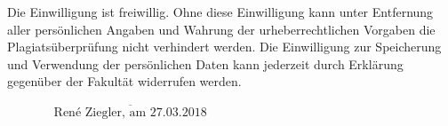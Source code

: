 \documentclass[12pt,oneside,a4paper,parskip]{scrbook}
\def\BaAuthor{René Ziegler}
\def\BaDeadline{27.03.2018}
\begin{document}
\begin{small}
Die Einwilligung ist freiwillig. Ohne diese Einwilligung kann unter Entfernung aller persönlichen Angaben und Wahrung der urheberrechtlichen Vorgaben die Plagiatsüberprüfung nicht verhindert werden. Die Einwilligung zur Speicherung und Verwendung der persönlichen Daten kann jederzeit durch Erklärung gegenüber der Fakultät widerrufen werden.
\end{small}

\vspace{20pt}
\begin{flushright}
$\overline{~~~~~~~~~~~~~~~~~\mbox{\BaAuthor, am \BaDeadline}~~~~~~~~~~~~~~~~~}$
\end{flushright}
\end{document}
